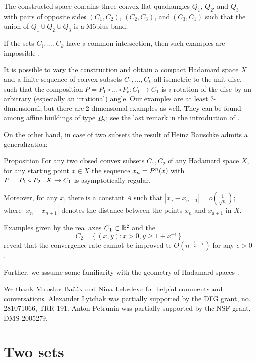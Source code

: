 \documentclass[a4paper,10pt]{article}
\begin{document}
The constructed space contains three convex flat quadrangles $Q_1$, $Q_2$, and $Q_3$ with pairs of opposite sides $(C_1,C_2)$, $(C_2,C_3)$, and $(C_3,C_1)$ such that the union of $Q_1\cup Q_2\cup Q_3$ is a Möbius band.

If the sets $C_1,\dots,C_k$ have a common intersection, then such examples are impossible \cite{asymptotic,Bac2,Bac}.

It is possible to vary the construction and obtain a compact Hadamard space $X$ and a finite sequence of convex subsets $C_1,\dots,C_k$ all isometric to the unit disc, such that the composition $P=P_1\circ \dots\circ      P_k :C_1\to C_1$  is a rotation of the disc by an arbitrary (especially an irrational) angle.
Our examples are at least 3-dimensional, but there are 2-dimensional examples as well.
They can be found among affine buildings of type $\tilde B_2$; see the last remark in the introduction of \cite{balser}. 

On the other hand, in case of two subsets the result of  Heinz Bauschke \cite{Bauschke} admits a generalization:

\begin{thm}{Proposition} \label{prop}
For any two closed convex subsets $C_1,C_2$ of any Hadamard space $X$, for any starting point $x\in X$  the sequence $x_n \z= P^n (x)$ with $P\z=  P_1\circ P_2 :X\to C_1$ is asymptotically  regular.

Moreover, for any $x$, there is a constant $A$ such that 
$|x_n-x_{n+1}| =o (\frac  {1} {\sqrt n})$;
where $|x_n-x_{n+1}|$ denotes the distance between the points $x_n$ and $x_{n+1}$ in $X$.
\end{thm}

Examples given by the real axes $C_1 \subset \mathbb{R}^2$ and the
\[C_2  = \{\,(x,y):x>0, y \geq 1+ x^{ -\epsilon}\,\}\]
reveal that the convergence rate cannot be improved to $O (n^{-\frac 1 2  -\epsilon})$ for any $\epsilon >0$.

Further, we assume some familiarity with the geometry of Hadamard spaces \cite{BBI,BH,AKP,AKP_inv,ballmannbook}.

We thank Miroslav Bačák and Nina Lebedeva for helpful comments and conversations.
Alexander Lytchak was partially supported by the DFG grant, no. 281071066, TRR 191.
Anton Petrunin was partially supported by the NSF grant, DMS-2005279.


\section{Two sets}
\end{document}
